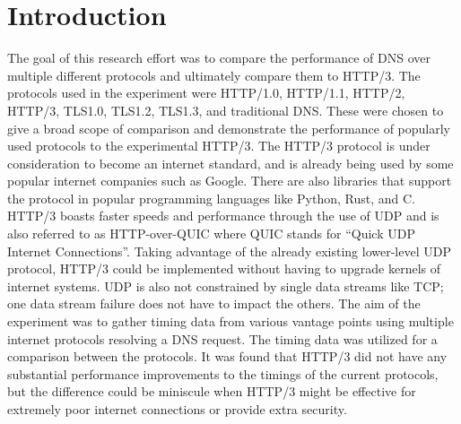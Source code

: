 \section{Introduction}
The goal of this research effort was to compare the performance of DNS over multiple different protocols and ultimately compare them to HTTP/3.  The protocols used in the experiment were HTTP/1.0, HTTP/1.1, HTTP/2, HTTP/3, TLS1.0, TLS1.2, TLS1.3, and traditional DNS. These were chosen to give a broad scope of comparison and demonstrate the performance of popularly used protocols to the experimental HTTP/3. The HTTP/3 protocol is under consideration to become an internet standard, and is already being used by some popular internet companies such as Google.  There are also libraries that support the protocol in popular programming languages like Python, Rust, and C.  HTTP/3 boasts faster speeds and performance through the use of UDP and is also referred to as HTTP-over-QUIC where QUIC stands for “Quick UDP Internet Connections”.  Taking advantage of the already existing lower-level UDP protocol, HTTP/3 could be implemented without having to upgrade kernels of internet systems.  UDP is also not constrained by single data streams like TCP; one data stream failure does not have to impact the others.  The aim of the experiment was to gather timing data from various vantage points using multiple internet protocols resolving a DNS request.  The timing data was utilized for a comparison between the protocols.  It was found that HTTP/3 did not have any substantial performance improvements to the timings of the current protocols, but the difference could be miniscule when HTTP/3 might be effective for extremely poor internet connections or provide extra security.